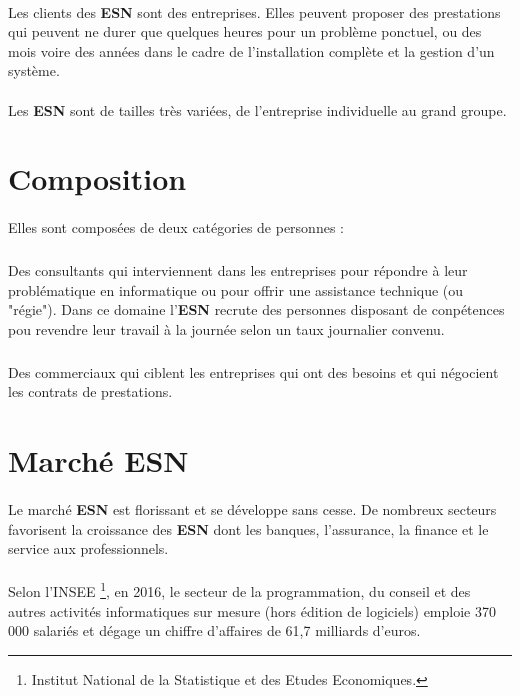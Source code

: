 \documentclass{article}
\begin{document}
\paragraph{}

Les clients des \textbf{ESN} sont des entreprises. Elles peuvent proposer des prestations qui peuvent ne durer que quelques heures pour un problème ponctuel, ou des mois voire des années dans le cadre de l'installation complète et la gestion d'un système.

\paragraph{}

Les \textbf{ESN} sont de tailles très variées, de l'entreprise individuelle au grand groupe.

\section{Composition}

\paragraph{}

Elles sont composées de deux catégories de personnes :

\subparagraph{}
Des consultants qui interviennent dans les entreprises pour répondre à leur problématique en informatique ou pour offrir une assistance technique (ou "régie"). Dans ce domaine l'\textbf{ESN} recrute des personnes disposant de conpétences pou revendre leur travail à la journée selon un taux journalier convenu.
\subparagraph{}
Des commerciaux qui ciblent les entreprises qui ont des besoins et qui négocient les contrats de prestations.

\section{Marché \textbf{ESN}}

\paragraph{}

Le marché \textbf{ESN} est florissant et se développe sans cesse. De nombreux secteurs favorisent la croissance des \textbf{ESN} dont les banques, l'assurance, la finance et le service aux professionnels.

\paragraph{}
Selon l'INSEE \footnote{Institut National de la Statistique et des Etudes Economiques.}, en 2016, le secteur de la programmation, du conseil et des autres activités informatiques sur mesure (hors édition de logiciels) emploie 370 000 salariés et dégage un chiffre d'affaires de 61,7 milliards d'euros.
\end{document}
